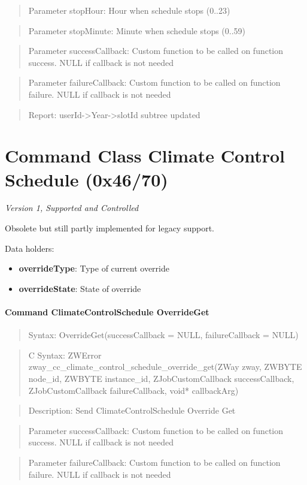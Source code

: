 \begin{quote}Parameter stopHour: Hour when schedule stops (0..23)\end{quote}
\begin{quote}Parameter stopMinute: Minute when schedule stops (0..59)\end{quote}
\begin{quote}Parameter successCallback: Custom function to be called on function success. NULL if callback is not needed\end{quote}
\begin{quote}Parameter failureCallback: Custom function to be called on function failure. NULL if callback is not needed\end{quote}
\begin{quote}Report: userId->Year->slotId subtree updated\end{quote}


\section{Command Class Climate Control Schedule (0x46/70)}

\textit{Version 1, Supported and Controlled}
\newline

Obsolete but still partly implemented for legacy support.
\newline

\noindent
Data holders:

\begin{itemize}
\item \textbf{overrideType}: Type of current override
\item \textbf{overrideState}: State of override
\end{itemize}

\paragraph{Command ClimateControlSchedule OverrideGet}
\begin{quote}Syntax: OverrideGet(successCallback = NULL, failureCallback = NULL)\end{quote}
\begin{quote}C Syntax: ZWError zway\_cc\_climate\_control\_schedule\_override\_get(ZWay zway, ZWBYTE node\_id, ZWBYTE instance\_id, ZJobCustomCallback successCallback, ZJobCustomCallback failureCallback, void* callbackArg)\end{quote}
\begin{quote}Description: Send ClimateControlSchedule Override Get\end{quote}
\begin{quote}Parameter successCallback: Custom function to be called on function success. NULL if callback is not needed\end{quote}
\begin{quote}Parameter failureCallback: Custom function to be called on function failure. NULL if callback is not needed\end{quote}


